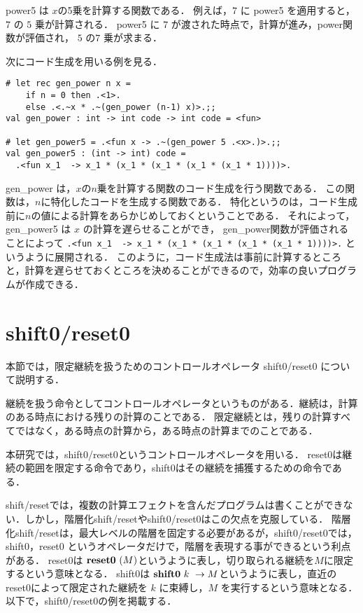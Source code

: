 power5 は $x$の5乗を計算する関数である．
例えば，$7$ に power5 を適用すると，$7$ の $5$ 乗が計算される．
power5 に $7$ が渡された時点で，計算が進み，power関数が評価され， $5$ の$7$ 乗が求まる．

次にコード生成を用いる例を見る．

\begin{lstlisting}
# let rec gen_power n x =
    if n = 0 then .<1>.
    else .<.~x * .~(gen_power (n-1) x)>.;;
val gen_power : int -> int code -> int code = <fun>

# let gen_power5 = .<fun x -> .~(gen_power 5 .<x>.)>.;;
val gen_power5 : (int -> int) code =
  .<fun x_1  -> x_1 * (x_1 * (x_1 * (x_1 * (x_1 * 1))))>.
\end{lstlisting}

gen\_power は，$x$の$n$乗を計算する関数のコード生成を行う関数である．
この関数は，$n$に特化したコードを生成する関数である．
特化というのは，コード生成前に$n$の値による計算をあらかじめしておくということである．
それによって，gen\_power5 は $x$ の計算を遅らせることができ，
gen\_power関数が評価されることによって \lstinline|.<fun x_1  -> x_1 * (x_1 * (x_1 * (x_1 * (x_1 * 1))))>.| というように展開される．
このように，コード生成法は事前に計算するところと，計算を遅らせておくところを決めることができるので，効率の良いプログラムが作成できる．


\section{shift0/reset0}
本節では，限定継続を扱うためのコントロールオペレータ shift0/reset0 について説明する．

継続を扱う命令としてコントロールオペレータというものがある．継続は，計算のある時点における残りの計算のことである．
限定継続とは，残りの計算すべてではなく，ある時点の計算から，ある時点の計算までのことである．

本研究では，shift0/reset0というコントロールオペレータを用いる．
reset0は継続の範囲を限定する命令であり，shift0はその継続を捕獲するための命令である．

shift/reset\cite{Danvy1990}では，複数の計算エフェクトを含んだプログラムは書くことができない．しかし，階層化shift/resetやshift0/reset0はこの欠点を克服している．
階層化shift/reset\cite{Danvy1990}は，最大レベルの階層を固定する必要があるが，shift0/reset0では，shift0，reset0 というオペレータだけで，階層を表現する事ができるという利点がある．
reset0は $\textbf{reset0}~ (M)$というように表し，切り取られる継続を$M$に限定するという意味となる．
shift0は $\textbf{shift0}~ k~ \to M$というように表し，直近のreset0によって限定された継続を $k$ に束縛し，$M$ を実行するという意味となる．
以下で，shift0/reset0の例を掲載する．

